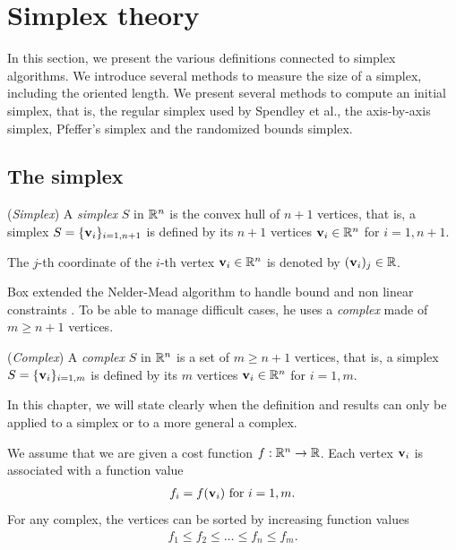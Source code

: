 \chapter{Simplex theory}
\label{chapter-simplextheory}

In this section, we present the various definitions connected
to simplex algorithms. We introduce several methods to measure 
the size of a simplex, including the oriented length. 
We present several methods to compute an
initial simplex, that is, the regular simplex used by Spendley et al.,
the axis-by-axis simplex, Pfeffer's simplex and the randomized 
bounds simplex.

\section{The simplex}

\begin{definition}
(\emph{Simplex})
A \emph{simplex} $S$ in $\mathbb{R}^n$ is the convex hull of $n+1$ vertices, that is, 
a simplex $S=\{\mathbf{v}_i\}_{i=1,n+1}$ is defined 
by its $n+1$ vertices $\mathbf{v}_i \in \mathbb{R}^n$ for $i=1,n+1$.
\end{definition}

The $j$-th coordinate of the $i$-th vertex $\mathbf{v}_i\in\mathbb{R}^n$ is denoted  
by $(\mathbf{v}_i)_j\in\mathbb{R}$.

Box extended the Nelder-Mead algorithm to handle bound and non linear constraints \cite{Box1965}.
To be able to manage difficult cases, he uses a \emph{complex} made of $m\geq n+1$ vertices.

\begin{definition}
(\emph{Complex})
A \emph{complex} $S$ in $\mathbb{R}^n$ is a set of $m\geq n+1$ vertices, that is, 
a simplex $S=\{\mathbf{v}_i\}_{i=1,m}$ is defined 
by its $m$ vertices $\mathbf{v}_i \in \mathbb{R}^n$ for $i=1,m$.
\end{definition}

In this chapter, we will state clearly when the definition and results can only be applied 
to a simplex or to a more general a complex. 

We assume that we are given a cost function $f:\mathbb{R}^n\rightarrow\mathbb{R}$.
Each vertex $\mathbf{v}_i$ is associated with a function value 
\begin{eqnarray}
f_i = f(\mathbf{v}_i) \textrm{ for } i=1,m.
\end{eqnarray}
For any complex, the vertices can be sorted by increasing function values 
\begin{eqnarray}
\label{simplex-sortedfv}
f_1 \leq f_2 \leq \ldots \leq f_n \leq f_m.
\end{eqnarray}

